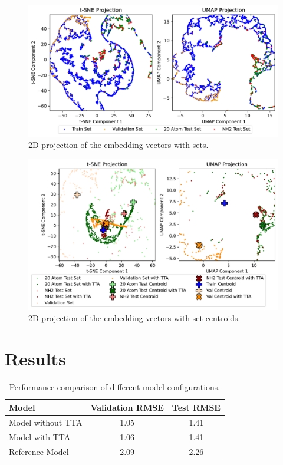 \documentclass[11pt,a4paper]{article}
\begin{document}
\begin{figure}[htbp]
        \centering
        \includegraphics[width=1\textwidth]{sets.pdf}
        \caption{2D projection of the embedding vectors with sets.}
        \label{fig:sets}
\end{figure}

\begin{figure}[htbp]
        \centering
        \includegraphics[width=1\textwidth]{sets_TTA.pdf}
        \caption{2D projection of the embedding vectors with set centroids.}
        \label{fig:sets_TTA}
\end{figure}

\section{Results}

\begin{table}[htbp]
        \centering
        \begin{tabular}{@{}lcc@{}}
                \toprule
                \textbf{Model}    & \textbf{Validation RMSE} & \textbf{Test RMSE} \\
                \midrule
                Model without TTA & 1.05                     & 1.41               \\
                Model with TTA    & 1.06                     & 1.41               \\
                Reference Model   & 2.09                     & 2.26               \\
                \bottomrule
        \end{tabular}
        \caption{Performance comparison of different model configurations.}
        \label{tab:results}
\end{table}
\end{document}
